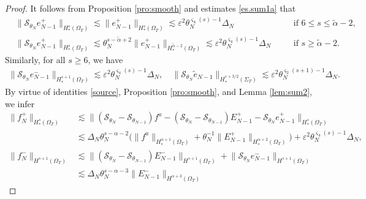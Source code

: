 \documentclass[twoside,11pt]{article}
\numberwithin{equation}{section}
\begin{document}
\begin{proof}
	It follows from Proposition \ref{pro:smooth} and estimates \eqref{es.sum1a} that
	\begin{align*}
		&	\big\|\mathcal{S}_{\theta_{{N}}} e_{N-1}^+ \big\|_{H_*^s(\Omega_{T})}
		\lesssim 	\big\|  e_{N-1}^+ \big\|_{H_*^s(\Omega_{T})}
		\lesssim \varepsilon^2 \theta_N^{\varsigma_4(s)-1}\varDelta_N
		\quad&& \textrm{if } 6\leq s\leq \widetilde{\alpha}-2,\\
		&	\big\|\mathcal{S}_{\theta_{{N}}} e_{N-1}^+ \big\|_{H_*^s(\Omega_{T})}
		\lesssim \theta_{{N}}^{s-\widetilde{\alpha}+2}	
		\big\|  e_{N-1}^+ \big\|_{H_*^{\widetilde{\alpha}-2}(\Omega_{T})}
		\lesssim \varepsilon^2 \theta_N^{\varsigma_4(s)-1}\varDelta_N
		\quad &&\textrm{if }  s\geq \widetilde{\alpha}-2.
	\end{align*}
	Similarly, for all $s\geq 6$, we have
	\begin{align*}
		\big\|\mathcal{S}_{\theta_{{N}}} e_{N-1}^- \big\|_{H_*^{s+1}(\Omega_{T})}
		\lesssim \varepsilon^2 \theta_N^{\varsigma_4(s)-1}\varDelta_N,
		\quad 	
		\big\|\mathcal{S}_{\theta_{{N}}} \tilde{e}_{N-1}  \big\|_{H_*^{s+3/2}(\Sigma_{T})}
		\lesssim \varepsilon^2 \theta_N^{\varsigma_2(s+1)-1}\varDelta_N.
	\end{align*}
	By virtue of  identities \eqref{source}, Proposition \ref{pro:smooth}, and Lemma \ref{lem:sum2}, we infer
	\begin{align*}
		\big\|f_N^+\big\|_{H_*^{s}(\Omega_{T})}
		&\lesssim
		\big\|(\mathcal{S}_{\theta_{{N}}}-\mathcal{S}_{\theta_{{N}-1}})f^a
		-(\mathcal{S}_{\theta_{{N}}}-\mathcal{S}_{\theta_{{N}-1}})E_{{N}-1}^+
		-\mathcal{S}_{\theta_{{N}}}e_{{N}-1}^+\big\|_{H_*^{s}(\Omega_{T})} \\
		&
		\lesssim \varDelta_{{N}}
		\theta_{{N}}^{s-{\alpha }-2}\big(\big\|f^a\big\|_{H_*^{\alpha +1}(\Omega_{T})}
		+\theta_{{N}}^{-1}\big\|E_{{N}-1}^+\big\|_{H_*^{\alpha +2}(\Omega_{T})} \big)
		+\varepsilon^2 \theta_N^{\varsigma_4(s)-1}\varDelta_N,\\[1mm]
		\big\|f_{{N}}^-\big\|_{H^{s+1}(\Omega_{T})}
		&\lesssim \big\|(\mathcal{S}_{\theta_{{N}}}-\mathcal{S}_{\theta_{{N}-1}})E_{{N}-1}^-\big\|_{H^{s+1}(\Omega_{T})}
		+\big\|\mathcal{S}_{\theta_{{N}}}e_{{N}-1}^-\big\|_{H^{s+1}(\Omega_{T})}\\
		&\lesssim
		\varDelta_{{N}}
		\theta_{{N}}^{s-{\alpha }-3}\big\|E_{{N}-1}^-\big\|_{H^{\alpha+3}(\Omega_{T})}

\end{align*}
\end{proof}
\end{document}
